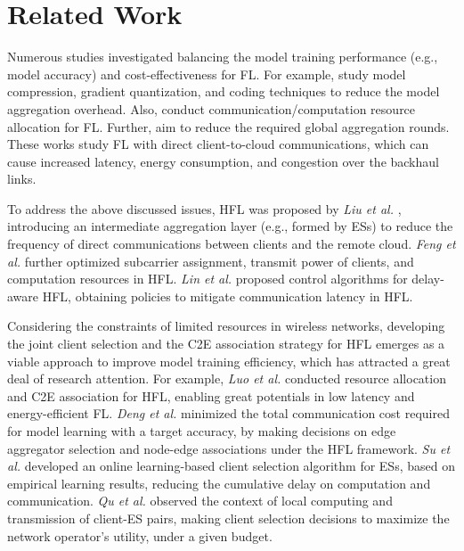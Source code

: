 \section{Related Work}
Numerous studies investigated balancing the model training performance (e.g., model accuracy) and cost-effectiveness for FL. For example, \cite{ref15,ref16,ref17} study model compression, gradient quantization, and coding techniques to reduce the model aggregation overhead. Also, \cite{ref18,ref19,ref20} conduct communication/computation resource allocation for FL. Further, \cite{ref21,ref22} aim to reduce the required global aggregation rounds. These works study FL with direct client-to-cloud communications, which can cause increased latency, energy consumption, and congestion over the backhaul links.

To address the above discussed issues, HFL was proposed by \textit{Liu et al.} \cite{ref8}, introducing an intermediate aggregation layer (e.g., formed by ESs) to reduce the frequency of direct communications between clients and the remote cloud. \textit {Feng et al.} \cite{ref24} further optimized subcarrier assignment, transmit power of clients, and computation resources in HFL. \textit {Lin et al.} \cite{ref25} proposed control algorithms for delay-aware HFL, obtaining policies to mitigate communication latency in HFL. 

Considering the constraints of limited resources in wireless networks, developing the joint client selection and the C2E association strategy for HFL emerges as a viable approach to improve model training efficiency, which has attracted a great deal of research attention. For example, \textit {Luo et al.} \cite{ref5} conducted resource allocation and C2E association for HFL, enabling great potentials in low latency and energy-efficient FL. \textit{Deng et al.} \cite{ref10} minimized the total communication cost required for model learning with a target accuracy, by making decisions on edge aggregator selection and node-edge associations under the HFL framework. \textit{Su et al.} \cite{ref26} developed an online learning-based client selection algorithm for ESs, based on empirical learning results, reducing the cumulative delay on computation and communication. \textit{Qu et al.} \cite{ref27} observed the context of local computing and transmission of client-ES pairs, making client selection decisions to maximize the network operator’s utility, under a given budget. 


